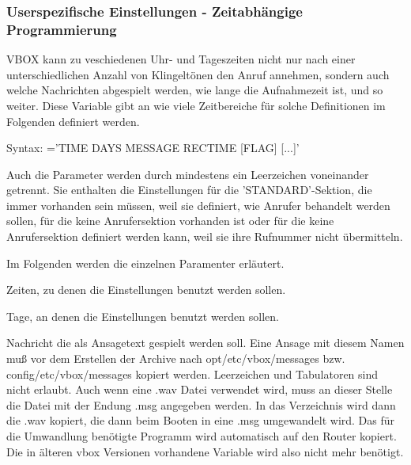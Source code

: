 \subsubsection{Userspezifische Einstellungen - Zeitabhängige Programmierung}

\begin{description}


    VBOX kann zu veschiedenen Uhr- und Tageszeiten nicht nur nach einer unterschiedlichen 
    Anzahl von Klingeltönen den Anruf annehmen, sondern auch welche Nachrichten abgespielt werden,
    wie lange die Aufnahmezeit ist, und so weiter. Diese Variable gibt an wie viele Zeitbereiche
    für solche Definitionen im Folgenden definiert werden.


    Syntax: ='TIME DAYS MESSAGE RECTIME [FLAG] [...]'
    
    Auch die Parameter  werden durch mindestens ein Leerzeichen
    voneinander getrennt. Sie enthalten die Einstellungen für die 'STANDARD'-Sektion, die immer vorhanden sein 
    müssen, weil sie definiert, wie Anrufer behandelt werden sollen, für die keine Anrufersektion 
    vorhanden ist oder für die keine Anrufersektion definiert werden kann, weil sie ihre Rufnummer 
    nicht übermitteln.
    
    Im Folgenden werden die einzelnen Paramenter erläutert.

    
    
    Zeiten, zu denen die Einstellungen benutzt werden sollen.

    
    
    Tage, an denen die Einstellungen benutzt werden sollen.

    
    
    Nachricht die als Ansagetext gespielt werden soll. Eine Ansage mit diesem Namen muß 
    vor dem Erstellen der Archive nach opt/etc/vbox/messages bzw. config/etc/vbox/messages
    kopiert werden. Leerzeichen und Tabulatoren sind nicht erlaubt. Auch wenn eine .wav
    Datei verwendet wird, muss an dieser Stelle die Datei mit der Endung .msg angegeben werden.
    In das Verzeichnis wird dann die .wav kopiert, die dann beim Booten in eine .msg umgewandelt
    wird. Das für die Umwandlung benötigte  Programm wird automatisch auf den Router kopiert.
    Die in älteren vbox Versionen vorhandene Variable  wird also nicht 
    mehr benötigt.


\end{description}
